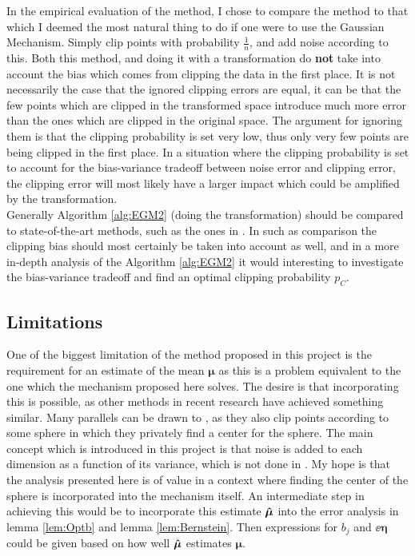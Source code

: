 \documentclass[a4paper,12pt]{article}
\begin{document}
In the empirical evaluation of the method, I chose to compare the method
to that which I deemed the most natural thing to do if 
one were to use the Gaussian Mechanism. Simply clip points with 
probability $\frac{1}{n}$, and add noise according to this.
Both this method, and doing it with a transformation do \textbf{not} take into account
the bias which comes from clipping the data in the first place. 
It is not necessarily the case that the ignored clipping errors are equal, 
it can be that the few points which are clipped in the transformed space introduce much more error
than the ones which are clipped in the original space. 
The argument for ignoring them is that the clipping probability is set very low,
thus only very few points are being clipped in the first place. In a situation where
the clipping probability is set to account for the bias-variance tradeoff between noise error
and clipping error, the clipping error will most likely have a larger impact which could be amplified by the transformation. \\
Generally Algorithm \ref{alg:EGM2} (doing the transformation) should
be compared to state-of-the-art methods, such as the ones in \cite{coinpress, Huang2021}.
In such as comparison the clipping bias should most certainly be taken into account as well, and
in a more in-depth analysis of the Algorithm \ref{alg:EGM2} it
would interesting to investigate the bias-variance tradeoff and find an
optimal clipping probability $p_{C}$.


\subsection{Limitations}
One of the biggest limitation of the method proposed in this project is the requirement for an estimate
of the mean $\bm{\mu}$ as this is a problem equivalent to the one which the mechanism proposed here solves.
The desire is that incorporating this is possible, as other methods in recent research have achieved something similar.
Many parallels can be drawn to \cite{Huang2021}, as they also clip points
according to some sphere in which they privately find a center for the sphere. The main concept which is introduced in this project
is that noise is added to each dimension as a function of its variance, which is not done in \cite{Huang2021}.
My hope is that the analysis presented here is of value in a context where finding the center of the sphere is incorporated
into the mechanism itself. 
An intermediate step in achieving this would be to incorporate this estimate $\bm{\hat{\mu}}$ into the error analysis in lemma \ref{lem:Optb} 
and lemma \ref{lem:Bernstein}. Then expressions for $b_j$ and $\ee{\bm{\eta}}$ could be given based on how well $\bm{\hat{\mu}}$ estimates $\bm{\mu}$.
\end{document}
